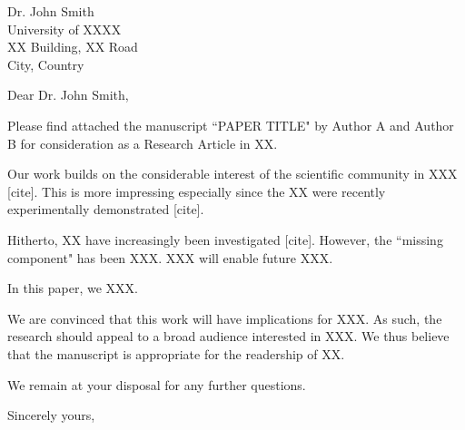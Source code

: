 \documentclass[a4paper,12pt]{letter}
\date{\today}
\begin{document}

\begin{letter}{
	Dr. John Smith \\
  University of XXXX \\
  XX Building, XX Road \\
	City, Country
}



\opening{Dear Dr. John Smith,}

Please find attached the manuscript ``PAPER TITLE" by Author A and Author B for consideration as a Research Article in XX.

Our work builds on the considerable interest of the scientific community in XXX [cite]. This  is more impressing especially since the XX were recently experimentally demonstrated [cite].

Hitherto, XX have increasingly been investigated [cite]. However, the ``missing component" has  been XXX. XXX will enable future XXX.

In this paper, we XXX.

We are convinced that this work will have implications for XXX. As such, the research should  appeal to a broad audience interested in XXX. We thus believe that the manuscript is  appropriate for the readership of XX.

We remain at your disposal for any further questions.

\bigskip%

\closing{Sincerely yours,}



\end{letter}
\end{document}
